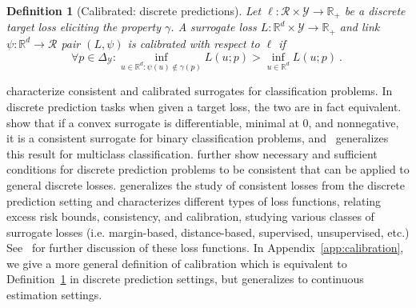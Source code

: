 \documentclass{article}
\newcommand{\reals}{\mathbb{R}}
\newcommand{\simplex}{\Delta_\Y}
\newcommand{\R}{\mathcal{R}}
\newcommand{\Y}{\mathcal{Y}}
\newtheorem{definition}{Definition}
\begin{document}
\begin{definition}[Calibrated: discrete predictions]\label{def:calibrated-finite}
	Let $\ell : \R \times \Y \to \reals_+$ be a discrete target loss eliciting the property $\gamma$.
	A surrogate loss $L : \reals^d \times \Y \to \reals_+$  and link $\psi:\reals^d \to \R$ pair $(L, \psi)$ is \emph{calibrated} with respect to $\ell$ if 
	\begin{equation}\label{eq:calibration}
	\forall p \in \simplex: \inf_{u \in \reals^d : \psi(u) \not \in \gamma(p)} L(u;p) > \inf_{u \in \reals^d} L(u;p)~.~
	\end{equation}
\end{definition}

\citet{zhang2004statistical,lin2004note,bartlett2006convexity,tewari2007consistency} characterize consistent and calibrated surrogates for classification problems.
In discrete prediction tasks when given a target loss, the two are in fact equivalent.  
\citet{bartlett2006convexity} show that if a convex surrogate is differentiable, minimal at $0$, and nonnegative, it is a consistent surrogate for binary classification problems, and~\citet{tewari2007consistency} generalizes this result for multiclass classification. 
\citet{ramaswamy2016convex} further show necessary and sufficient conditions for discrete prediction problems to be consistent that can be applied to general discrete losses.
\citet{steinwart2007compare} generalizes the study of consistent losses from the discrete prediction setting and characterizes different types of loss functions, relating excess risk bounds, consistency, and calibration, studying various classes of surrogate losses (i.e. margin-based, distance-based, supervised, unsupervised, etc.)
See~\citet[Chapter 2]{steinwart2008support} for further discussion of these loss functions.
In Appendix~\ref{app:calibration}, we give a more general definition of calibration which is equivalent to Definition~\ref{def:calibrated-finite} in discrete prediction settings, but generalizes to continuous estimation settings.
\end{document}
